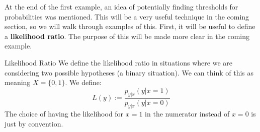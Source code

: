 At the end of the first example, an idea of potentially finding thresholds for probabilities was mentioned. This will be a very useful technique in the coming section, so we will walk through examples of this. First, it will be useful to define a \textbf{likelihood ratio}. The purpose of this will be made more clear in the coming example.
\begin{defn}{Likelihood Ratio}{}
We define the likelihood ratio in situations where we are considering two possible hypotheses (a binary situation). We can think of this as meaning \(X = \{0, 1\}\). We define:
\begin{equation*}
  L(y) := \frac{p_{y|x}(y|x=1)}{p_{y|x}(y|x=0)}
\end{equation*}
The choice of having the likelihood for \(x=1\) in the numerator instead of \(x=0\) is just by convention.
\end{defn}


